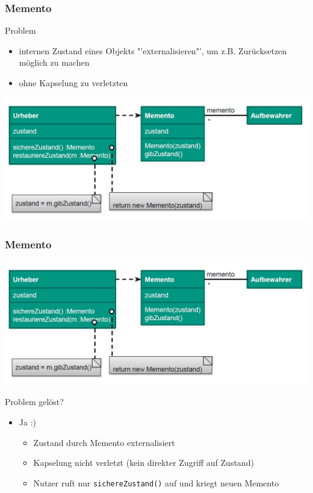 \documentclass[18pt]{beamer}
\begin{document}
	\begin{frame}
		\frametitle{Memento}
		\begin{block}{Problem}
			\begin{itemize}
				\item internen Zustand eines Objekts "'externalisieren"', um z.B. Zurücksetzen möglich zu machen \pause 
				\item ohne Kapselung zu verletzten
			\end{itemize}
		\end{block}
		\pause
		\centering
		\includegraphics[scale=0.4]{./pics/tut4/mem.png}
	\end{frame}

	\begin{frame}
		\frametitle{Memento}
		\includegraphics[scale=0.4]{./pics/tut4/mem.png}
		\begin{block}{Problem gelöst?}
			\begin{itemize}
				\pause
				\item Ja :)
				\begin{itemize}
					\pause
					\item Zustand durch Memento externalisiert \pause
					\item Kapselung nicht verletzt (kein direkter Zugriff auf Zustand)
					\item Nutzer ruft nur \texttt{sichereZustand()} auf und kriegt neuen Memento
				\end{itemize}
			\end{itemize}
		\end{block}
	\end{frame}
\end{document}
